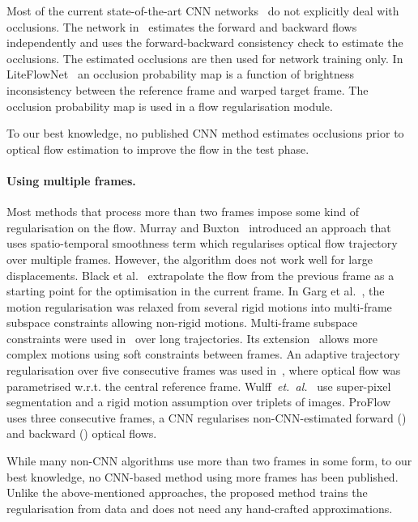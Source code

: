 \documentclass[runningheads]{llncs}
\newcommand{\etal}[0]{~{\it et.~al.}}
\begin{document}
Most of the current state-of-the-art CNN networks~\cite{Dosovitskiy2015,Ilg2016,Ranjan2016,Sun2017} do not explicitly deal with occlusions. 
The network in~\cite{Meister2017} estimates the forward and backward flows independently and uses the forward-backward consistency check to estimate the occlusions. The estimated occlusions are then used for network training only.
In LiteFlowNet~\cite{Hui2018} an occlusion probability map is a function of brightness inconsistency between the reference frame and warped target frame.
The occlusion probability map is used in a flow regularisation module.

To our best knowledge, no published CNN method estimates occlusions prior to optical flow estimation to improve the flow in the test phase.

\paragraph{\bf Using multiple frames.}
Most methods that process more than two frames impose some kind of regularisation on the flow. Murray and Buxton~\cite{Murray1987} introduced an approach that uses spatio-temporal smoothness term which regularises optical flow trajectory over multiple frames. However, the algorithm does not work well for large displacements. 
Black et al.~\cite{Black1991} extrapolate the flow from the previous frame as a starting point for the optimisation in the current frame.
In Garg et al.~\cite{Garg2010}, the motion regularisation was relaxed from several rigid motions into multi-frame subspace constraints allowing non-rigid motions.
Multi-frame subspace constraints were used in~\cite{Irani2002} over long trajectories. Its extension~\cite{Garg2013} allows more complex motions using soft constraints between frames.
An adaptive trajectory regularisation over five consecutive frames was used in~\cite{Volz2011}, where optical flow was parametrised w.r.t. the central reference frame.
Wulff\etal~\cite{Wulff2017} use super-pixel segmentation and a rigid motion assumption over triplets of images. ProFlow~\cite{Maurer2018} uses three consecutive frames, a CNN regularises  non-CNN-estimated forward () and backward () optical flows.

While many non-CNN algorithms use more than two frames in some form, to our best knowledge, no CNN-based method using more frames has been published.
Unlike the above-mentioned approaches, the proposed method trains the regularisation from data and does not need any hand-crafted approximations. 
\end{document}
